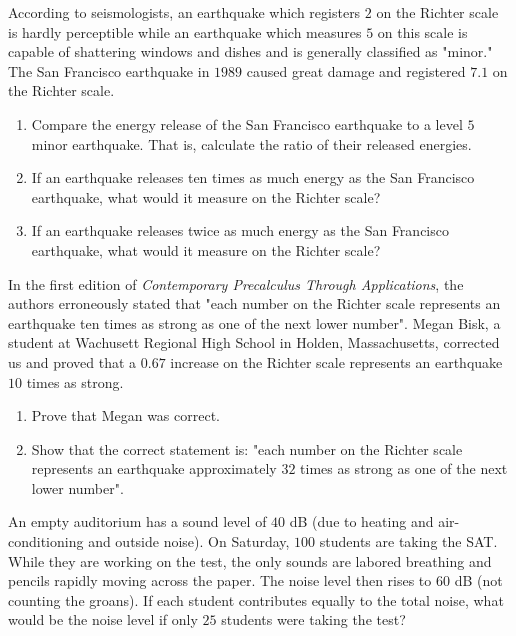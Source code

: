 \documentclass[10pt,]{book}
\theoremstyle{ptxdefinitionnotitle}
\theoremstyle{ptxdefinitiontitle}
\theoremstyle{ptxdefinitionnotitle}
\theoremstyle{ptxdefinitiontitle}
\theoremstyle{ptxdefinitionnotitle}
\theoremstyle{ptxdefinitiontitle}
\numberwithin{equation}{section}
\begin{document}
\begin{divisionexercise}{4}\hypertarget{exercise-86}{}
\hypertarget{p-316}{}%
According to seismologists, an earthquake which registers \(2\) on the Richter scale is hardly perceptible while an earthquake which measures \(5\) on this scale is capable of shattering windows and dishes and is generally classified as "minor."  The San Francisco earthquake in \(1989\) caused great damage and registered \(7.1\) on the Richter scale. \leavevmode%
\begin{enumerate}[label=(\alph*)]
\item\hypertarget{li-228}{}Compare the energy release of the San Francisco earthquake to a level \(5\) minor earthquake.  That is, calculate the ratio of their released energies.%
\item\hypertarget{li-229}{}If an earthquake releases ten times as much energy as the San Francisco earthquake, what would it measure on the Richter scale?%
\item\hypertarget{li-230}{}If an earthquake releases twice as much energy as the San Francisco earthquake, what would it measure on the Richter scale?%
\end{enumerate}
%
\end{divisionexercise}%
\begin{divisionexercise}{5}\hypertarget{exercise-87}{}
\hypertarget{p-317}{}%
In the first edition of \emph{Contemporary Precalculus Through Applications}, the authors erroneously stated that "each number on the Richter scale represents an earthquake ten times as strong as one of the next lower number".  Megan Bisk, a student at Wachusett Regional High School in Holden, Massachusetts, corrected us and proved that a \(0.67\) increase on the Richter scale represents an earthquake \(10\) times as strong. \leavevmode%
\begin{enumerate}[label=(\alph*)]
\item\hypertarget{li-231}{}Prove that Megan was correct.%
\item\hypertarget{li-232}{}Show that the correct statement is: "each number on the Richter scale represents an earthquake approximately \(32\) times as strong as one of the next lower number".%
\end{enumerate}
%
\end{divisionexercise}%
\begin{divisionexercise}{6}\hypertarget{exercise-88}{}
\hypertarget{p-318}{}%
An empty auditorium has a sound level of \(40\) dB (due to heating and air-conditioning and outside noise).  On Saturday, \(100\) students are taking the SAT.  While they are working on the test, the only sounds are labored breathing and pencils rapidly moving across the paper.  The noise level then rises to \(60\) dB (not counting the groans).  If each student contributes equally to the total noise, what would be the noise level if only \(25\) students were taking the test?%
\end{divisionexercise}%
\end{document}
